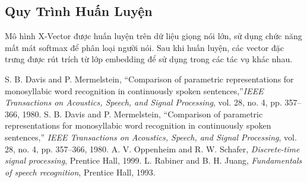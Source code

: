 \documentclass{article}
\begin{document}
\subsection{Quy Trình Huấn Luyện}

Mô hình X-Vector được huấn luyện trên dữ liệu giọng nói lớn, sử dụng chức năng mất mát softmax để phân loại người nói.
Sau khi huấn luyện, các vector đặc trưng được rút trích từ lớp embedding để sử dụng trong các tác vụ khác nhau.

\begin{thebibliography}{9}
     S. B. Davis and P. Mermelstein, \textquotedblleft Comparison of parametric representations for monosyllabic word recognition in continuously spoken sentences,\textquotedblright \emph{IEEE Transactions on Acoustics, Speech, and Signal Processing}, vol. 28, no. 4, pp. 357–366, 1980.
     S. B. Davis and P. Mermelstein, ``Comparison of parametric representations for monosyllabic word recognition in continuously spoken sentences,'' \emph{IEEE Transactions on Acoustics, Speech, and Signal Processing}, vol. 28, no. 4, pp. 357–366, 1980.
     A. V. Oppenheim and R. W. Schafer, \emph{Discrete-time signal processing}, Prentice Hall, 1999.
     L. Rabiner and B. H. Juang, \emph{Fundamentals of speech recognition}, Prentice Hall, 1993.
\end{thebibliography}
\end{document}
